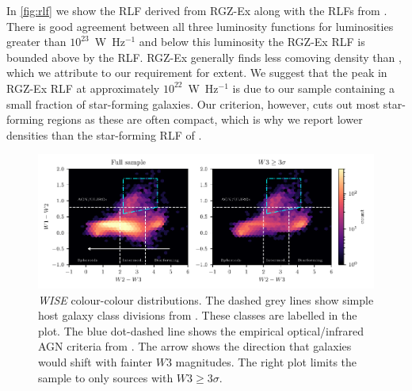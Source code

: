   In \autoref{fig:rlf} we show the RLF derived from RGZ-Ex along with the RLFs from \citet{mauch07rlf}. There is good
  agreement between all three luminosity functions for luminosities greater than $10^{23}$~W~Hz$^{-1}$
  and below this luminosity the RGZ-Ex RLF is bounded above by the
  \citet{mauch07rlf} RLF. RGZ-Ex generally finds less comoving density than \citet{mauch07rlf}, which we attribute to our requirement for extent. We suggest that the peak in RGZ-Ex RLF at approximately $10^{22}$~W~Hz$^{-1}$ is due to our sample containing a small fraction of star-forming galaxies. Our criterion, however, cuts out most star-forming regions as these are often compact, which is why we report lower densities than the star-forming RLF of \citet{mauch07rlf}.

\begin{figure}
    \centering
    \includegraphics[width=\linewidth]{rlf-images/colour-colour.pdf}
    \caption[\emph{WISE} colour-colour distributions.]{\emph{WISE} colour-colour distributions. The dashed grey lines show
      simple host galaxy class divisions from \citet{jarrett17wise}. These
      classes are labelled in the plot. The blue dot-dashed line shows
      the empirical optical/infrared AGN criteria from \citet{jarrett11wise}. The arrow shows the direction that galaxies would shift with fainter $W3$ magnitudes. The right plot limits the sample to only sources with $W3 \geq 3 \sigma$.
      \label{fig:colour-colour}}
  \end{figure}

